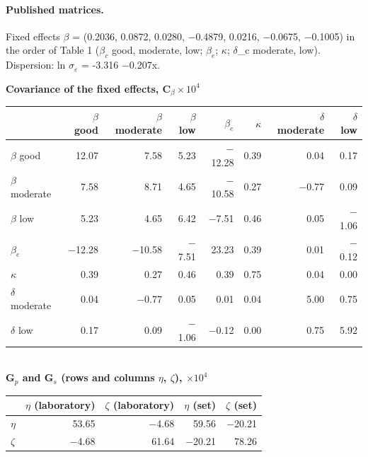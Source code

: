 \documentclass[Journal,letterpaper,InsideFigs,NoLists,NoLineNumbers]{ascelike-new}
\begin{document}
\paragraph{Published matrices.}
Fixed effects $\beta$ = (0.2036, 0.0872, 0.0280, $-$0.4879, 0.0216, $-$0.0675, $-$0.1005) in the order of Table 1 ($\beta_c$ good, moderate, low; $\beta_e$; $\kappa$; $\delta$\_c moderate, low). Dispersion: ln $\sigma_\varepsilon$ = -3.316 $-$0.207x.
\begin{center}\footnotesize
\textbf{Covariance of the fixed effects, $\mathbf{C}_\beta \times 10^4$}\\[2pt]
\begin{tabular}{lrrrrrrr}
\hline
 & $\beta$ good & $\beta$ moderate & $\beta$ low & $\beta_e$ & $\kappa$ & $\delta$ moderate & $\delta$ low \\
\hline
$\beta$ good & 12.07 & 7.58 & 5.23 & $-$12.28 & 0.39 & 0.04 & 0.17 \\
$\beta$ moderate & 7.58 & 8.71 & 4.65 & $-$10.58 & 0.27 & $-$0.77 & 0.09 \\
$\beta$ low & 5.23 & 4.65 & 6.42 & $-$7.51 & 0.46 & 0.05 & $-$1.06 \\
$\beta_e$ & $-$12.28 & $-$10.58 & $-$7.51 & 23.23 & 0.39 & 0.01 & $-$0.12 \\
$\kappa$ & 0.39 & 0.27 & 0.46 & 0.39 & 0.75 & 0.04 & 0.00 \\
$\delta$ moderate & 0.04 & $-$0.77 & 0.05 & 0.01 & 0.04 & 5.00 & 0.75 \\
$\delta$ low & 0.17 & 0.09 & $-$1.06 & $-$0.12 & 0.00 & 0.75 & 5.92 \\
\hline
\end{tabular}
\\[8pt]\textbf{$\mathbf{G}_p$ and $\mathbf{G}_s$ (rows and columns $\eta$, $\zeta$), $\times 10^4$}\\[2pt]
\begin{tabular}{lrrrr}
\hline
 & $\eta$ (laboratory) & $\zeta$ (laboratory) & $\eta$ (set) & $\zeta$ (set) \\
\hline
$\eta$ & 53.65 & $-$4.68 & 59.56 & $-$20.21 \\
$\zeta$ & $-$4.68 & 61.64 & $-$20.21 & 78.26 \\
\hline
\end{tabular}
\end{center}
\setcounter{table}{5}
\end{document}
